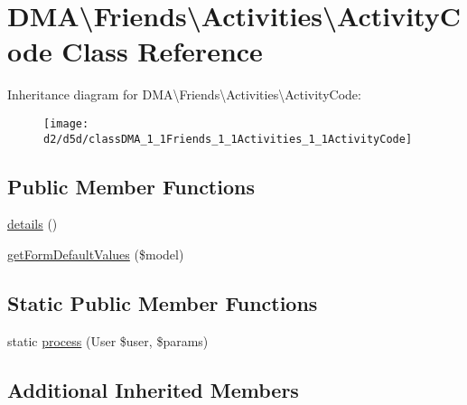 \hypertarget{classDMA_1_1Friends_1_1Activities_1_1ActivityCode}{\section{D\-M\-A\textbackslash{}Friends\textbackslash{}Activities\textbackslash{}Activity\-Code Class Reference}
\label{classDMA_1_1Friends_1_1Activities_1_1ActivityCode}
}
Inheritance diagram for D\-M\-A\textbackslash{}Friends\textbackslash{}Activities\textbackslash{}Activity\-Code\-:\begin{figure}[H]
\begin{center}
\leavevmode
\texttt{[image: d2/d5d/classDMA\_1\_1Friends\_1\_1Activities\_1\_1ActivityCode]}
\end{center}
\end{figure}
\subsection*{Public Member Functions}
\begin{DoxyCompactItemize}
\item 
\hyperlink{classDMA_1_1Friends_1_1Activities_1_1ActivityCode_a531ba09241d4bf7c0ad9d862422563c0}{details} ()
\item 
\hyperlink{classDMA_1_1Friends_1_1Activities_1_1ActivityCode_a13eb870ac4e33b0b3d522f0e28444e7e}{get\-Form\-Default\-Values} (\$model)
\end{DoxyCompactItemize}
\subsection*{Static Public Member Functions}
\begin{DoxyCompactItemize}
\item 
static \hyperlink{classDMA_1_1Friends_1_1Activities_1_1ActivityCode_a3de9ef142396ba94532566598b508d58}{process} (User \$user, \$params)
\end{DoxyCompactItemize}
\subsection*{Additional Inherited Members}


